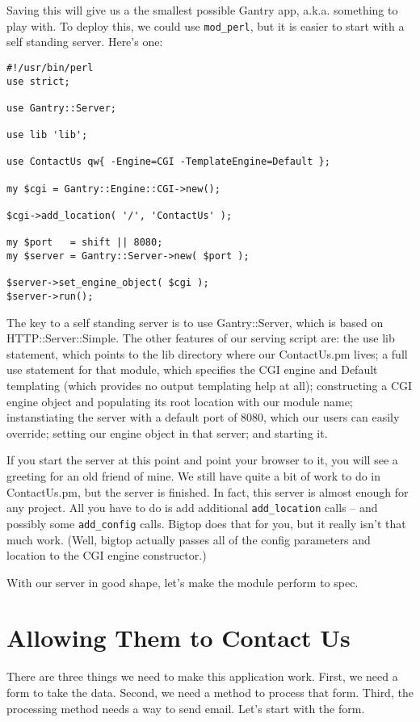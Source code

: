 Saving this will give us a the smallest possible Gantry app, a.k.a.
something to play with.  To deploy this, we could use \verb+mod_perl+,
but it is easier to start with a self standing server.  Here's one:

\begin{verbatim}
#!/usr/bin/perl
use strict;

use Gantry::Server;

use lib 'lib';

use ContactUs qw{ -Engine=CGI -TemplateEngine=Default };

my $cgi = Gantry::Engine::CGI->new();

$cgi->add_location( '/', 'ContactUs' );

my $port   = shift || 8080;
my $server = Gantry::Server->new( $port );

$server->set_engine_object( $cgi );
$server->run();
\end{verbatim}

The key to a self standing server is to use Gantry::Server, which is based
on HTTP::Server::Simple.  The other features of our serving script are:
the use lib statement, which points to the lib directory where our ContactUs.pm
lives; a full use statement for that module, which specifies the CGI engine
and Default templating (which provides no output templating help at all);
constructing a CGI engine object and populating its root location with
our module name; instanstiating the server with a default port of 8080,
which our users can easily override; setting our engine object in that
server; and starting it.

If you start the server at this point and point your browser to it, you
will see a greeting for an old friend of mine.  We still have quite a
bit of work to do in ContactUs.pm, but the server is finished.  In fact,
this server is almost enough for any project.  All you have to do is
add additional \verb+add_location+ calls -- and possibly some
\verb+add_config+ calls.  Bigtop does that for you, but it really isn't
that much work.  (Well, bigtop actually passes all of the config parameters
and location to the CGI engine constructor.)

With our server in good shape, let's make the module perform to spec.

\section{Allowing Them to Contact Us}

There are three things we need to make this application work.  First, we
need a form to take the data.  Second, we need a method to process that
form.  Third, the processing method needs a way to send email.  Let's start
with the form.

